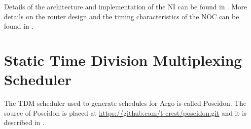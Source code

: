 \documentclass[a4paper,fontsize=10pt,twoside,DIV15,BCOR12mm,headinclude=true,footinclude=false,pagesize,bibtotoc]{scrbook}
\begin{document}
Details of the architecture and implementation of the NI can be found in \cite{tdmna}.
More details on the router design and the timing characteristics of the NOC can be found in
\cite{noc-elasticity}.



\section{Static Time Division Multiplexing Scheduler}
\label{sec:poseidon}

%
%
%




The TDM scheduler used to generate schedules for Argo is called Poseidon.
The source of Poseidon is placed at \url{https://github.com/t-crest/poseidon.git} and
it is described in \cite{scheduler-report}.
\end{document}
